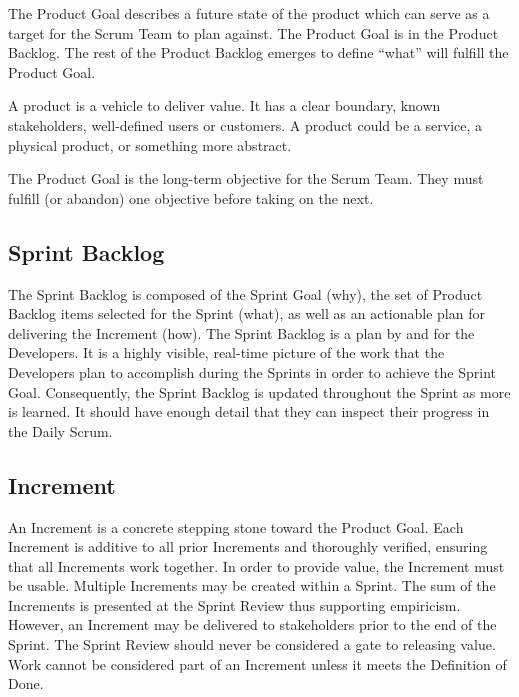 \begin{flushleft}
	The Product Goal describes a future state of the product which can serve as a target
	for the Scrum Team to plan against. The Product Goal is in the Product Backlog.
	The rest of the Product Backlog emerges to define ``what'' will fulfill the Product Goal.
\end{flushleft}

\begin{displaycquote}
	A product is a vehicle to deliver value. It has a clear boundary, known stakeholders,
	well-defined users or customers. A product could be a service, a physical product,
	or something more abstract.
\end{displaycquote}

\begin{flushleft}
	The Product Goal is the long-term objective for the Scrum Team. They must fulfill
	(or abandon) one objective before taking on the next.
\end{flushleft}

\subsection{Sprint Backlog}\label{scrum-sprint-backlog}

\begin{flushleft}
	The Sprint Backlog is composed of the Sprint Goal (why), the set of Product Backlog
	items selected for the Sprint (what), as well as an actionable plan for delivering
	the Increment (how). The Sprint Backlog is a plan by and for the Developers. It is
	a highly visible, real-time picture of the work that the Developers plan to accomplish
	during the Sprints in order to achieve the Sprint Goal. Consequently, the Sprint Backlog
	is updated throughout the Sprint as more is learned. It should have enough detail that
	they can inspect their progress in the Daily Scrum.
\end{flushleft}

\subsection{Increment}\label{scrum-increment}

\begin{flushleft}
	An Increment is a concrete stepping stone toward the Product Goal. Each Increment is
	additive to all prior Increments and thoroughly verified, ensuring that all Increments
	work together. In order to provide value, the Increment must be usable. Multiple
	Increments may be created within a Sprint. The sum of the Increments is presented at
	the Sprint Review thus supporting empiricism. However, an Increment may be delivered
	to stakeholders prior to the end of the Sprint. The Sprint Review should never be
	considered a gate to releasing value. Work cannot be considered part of an Increment
	unless it meets the Definition of Done.
\end{flushleft}

